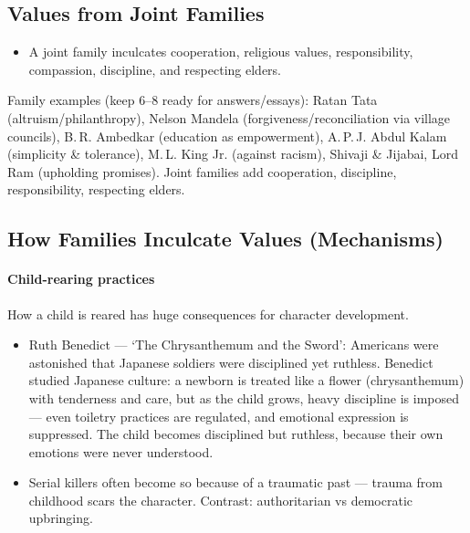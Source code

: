 \subsection{Values from Joint Families}

\begin{itemize}
\item A joint family inculcates cooperation, religious values, responsibility, compassion, discipline, and respecting elders.
\end{itemize}

\begin{QuickRevision}
Family examples (keep 6--8 ready for answers/essays): Ratan Tata (altruism/philanthropy), Nelson Mandela (forgiveness/reconciliation via village councils), B.\,R. Ambedkar (education as empowerment), A.\,P.\,J. Abdul Kalam (simplicity \& tolerance), M.\,L. King Jr. (against racism), Shivaji \& Jijabai, Lord Ram (upholding promises). Joint families add cooperation, discipline, responsibility, respecting elders.
\end{QuickRevision}

\subsection{How Families Inculcate Values (Mechanisms)}

\paragraph{Child-rearing practices} How a child is reared has huge consequences for character development.

\begin{ExampleBox}
\begin{itemize}
\item Ruth Benedict --- `The Chrysanthemum and the Sword': Americans were astonished that Japanese soldiers were disciplined yet ruthless. Benedict studied Japanese culture: a newborn is treated like a flower (chrysanthemum) with tenderness and care, but as the child grows, heavy discipline is imposed --- even toiletry practices are regulated, and emotional expression is suppressed. The child becomes disciplined but ruthless, because their own emotions were never understood.
\item Serial killers often become so because of a traumatic past --- trauma from childhood scars the character. Contrast: authoritarian vs democratic upbringing.
\end{itemize}
\end{ExampleBox}

